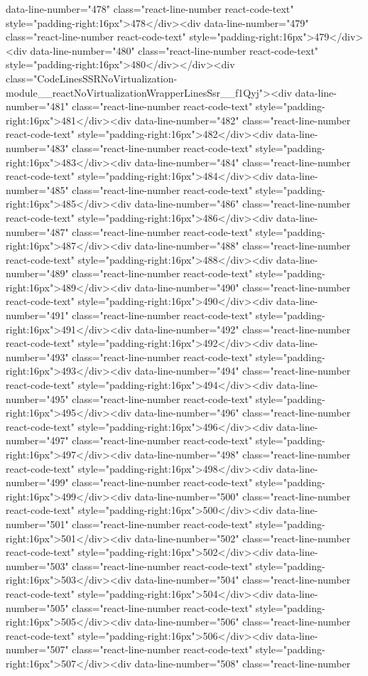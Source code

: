 {{{{{{{data-line-number="478" class="react-line-number react-code-text" style="padding-right:16px">478</div><div data-line-number="479" class="react-line-number react-code-text" style="padding-right:16px">479</div><div data-line-number="480" class="react-line-number react-code-text" style="padding-right:16px">480</div></div><div class="CodeLinesSSRNoVirtualization-module__reactNoVirtualizationWrapperLinesSsr__f1Qyj"><div data-line-number="481" class="react-line-number react-code-text" style="padding-right:16px">481</div><div data-line-number="482" class="react-line-number react-code-text" style="padding-right:16px">482</div><div data-line-number="483" class="react-line-number react-code-text" style="padding-right:16px">483</div><div data-line-number="484" class="react-line-number react-code-text" style="padding-right:16px">484</div><div data-line-number="485" class="react-line-number react-code-text" style="padding-right:16px">485</div><div data-line-number="486" class="react-line-number react-code-text" style="padding-right:16px">486</div><div data-line-number="487" class="react-line-number react-code-text" style="padding-right:16px">487</div><div data-line-number="488" class="react-line-number react-code-text" style="padding-right:16px">488</div><div data-line-number="489" class="react-line-number react-code-text" style="padding-right:16px">489</div><div data-line-number="490" class="react-line-number react-code-text" style="padding-right:16px">490</div><div data-line-number="491" class="react-line-number react-code-text" style="padding-right:16px">491</div><div data-line-number="492" class="react-line-number react-code-text" style="padding-right:16px">492</div><div data-line-number="493" class="react-line-number react-code-text" style="padding-right:16px">493</div><div data-line-number="494" class="react-line-number react-code-text" style="padding-right:16px">494</div><div data-line-number="495" class="react-line-number react-code-text" style="padding-right:16px">495</div><div data-line-number="496" class="react-line-number react-code-text" style="padding-right:16px">496</div><div data-line-number="497" class="react-line-number react-code-text" style="padding-right:16px">497</div><div data-line-number="498" class="react-line-number react-code-text" style="padding-right:16px">498</div><div data-line-number="499" class="react-line-number react-code-text" style="padding-right:16px">499</div><div data-line-number="500" class="react-line-number react-code-text" style="padding-right:16px">500</div><div data-line-number="501" class="react-line-number react-code-text" style="padding-right:16px">501</div><div data-line-number="502" class="react-line-number react-code-text" style="padding-right:16px">502</div><div data-line-number="503" class="react-line-number react-code-text" style="padding-right:16px">503</div><div data-line-number="504" class="react-line-number react-code-text" style="padding-right:16px">504</div><div data-line-number="505" class="react-line-number react-code-text" style="padding-right:16px">505</div><div data-line-number="506" class="react-line-number react-code-text" style="padding-right:16px">506</div><div data-line-number="507" class="react-line-number react-code-text" style="padding-right:16px">507</div><div data-line-number="508" class="react-line-number }}}}}}}
